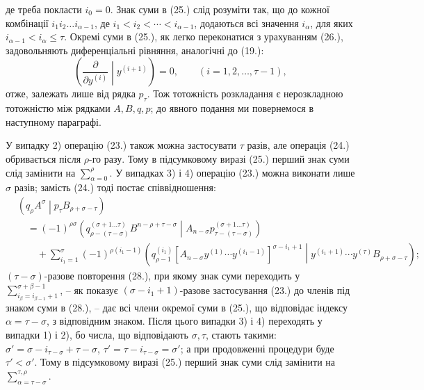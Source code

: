 \documentclass[11pt]{article}
\newcommand{\pair}[2]{\left(#1\middle|#2\right)}
\begin{document}
де треба покласти $i_0=0$. Знак суми в (25.) слід розуміти так, що до кожної комбінації $i_1i_2\ldots i_{\alpha-1}$, де $i_1<i_2<\cdots<i_{\alpha-1}$, додаються всі значення $i_\alpha$, для яких $i_{\alpha-1}<i_\alpha\le\tau$. Окремі суми в (25.), як легко переконатися з урахуванням (26.), задовольняють диференціальні рівняння, аналогічні до (19.):
\begin{equation}
 \left(\frac{\partial}{\partial y^{(i)}}\middle|y^{(i+1)}\right)=0,
 \qquad (i=1,2,\ldots,\tau-1),
\tag{27}
\end{equation}
отже, залежать лише від рядка $p_\tau$. Тож тотожність розкладання є нерозкладною тотожністю між рядками $A,B,q,p$; до явного подання ми повернемося в наступному параграфі.

У випадку 2) операцію (23.) також можна застосувати $\tau$ разів, але операція (24.) обривається після $\rho$-го разу. Тому в підсумковому виразі (25.) перший знак суми слід замінити на $\sum_{\alpha=0}^{\rho}$. У випадках 3) і 4) операцію (23.) можна виконати лише $\sigma$ разів; замість (24.) тоді постає співвідношення:
\begin{equation}
\begin{aligned}
&\pair{q_\rho A^\sigma}{p_\tau B_{\rho+\sigma-\tau}}\\
&\quad=(-1)^{\rho\sigma}
\pair{q_{\rho-(\tau-\sigma)}^{(\sigma+1\ldots\tau)}B^{n-\rho+\tau-\sigma}}
{A_{n-\sigma}p_{\tau-(\tau-\sigma)}^{(\sigma+1\ldots\tau)}}\\
&\qquad+\sum_{i_1=1}^{\sigma}(-1)^{\rho(i_1-1)}
\pair{q_{\rho-1}^{(i_1)}
[A_{n-\sigma}y^{(1)}\cdots y^{(i_1-1)}]^{\sigma-i_1+1}}
{y^{(i_1+1)}\cdots y^{(\tau)}B_{\rho+\sigma-\tau}};
\end{aligned}
\tag{28}
\end{equation}
$(\tau-\sigma)$-разове повторення (28.), при якому знак суми переходить у $\sum_{i_\beta=i_{\beta-1}+1}^{\sigma+\beta-1}$, -- як показує $(\sigma-i_1+1)$-разове застосування (23.) до членів під знаком суми в (28.), -- дає всі члени окремої суми в (25.), що відповідає індексу $\alpha=\tau-\sigma$, з відповідним знаком. Після цього випадки 3) і 4) переходять у випадки 1) і 2), бо числа, що відповідають $\sigma,\tau$, стають такими: $\sigma'=\sigma-i_{\tau-\sigma}+\tau-\sigma$, $\tau'=\tau-i_{\tau-\sigma}=\sigma'$; а при продовженні процедури буде $\tau'<\sigma'$. Тому в підсумковому виразі (25.) перший знак суми слід замінити на $\sum_{\alpha=\tau-\sigma}^{\tau,\rho}$.
\end{document}
